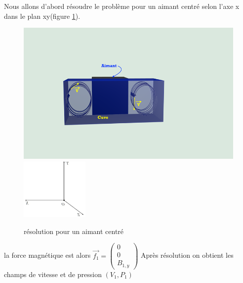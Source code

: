 \documentclass[a4paper,12pt,titlepage]{report}
\begin{document}
\begin{onehalfspace}
Nous allons d'abord résoudre le problème pour un aimant centré selon l'axe x dans le plan xy(figure \ref{figure fg}).
\begin{figure}[!h]
	\begin{center}
	\includegraphics[height = 8 cm, keepaspectratio]{graphes/config_centre.png}
	\includegraphics[height =3cm, keepaspectratio]{graphes/repere_retourne.jpg}
	\caption{résolution pour un aimant centré}
	\label{figure fg}
	\end{center}
\end{figure}
la force magnétique est alors $\vec{f_1} = \begin{pmatrix}
											0 \\
											0 \\
											B_{1,y}
											\end{pmatrix}$
Après résolution on obtient les champs de vitesse et de pression $(V_1, P_1)$
											

\end{onehalfspace}
\end{document}
